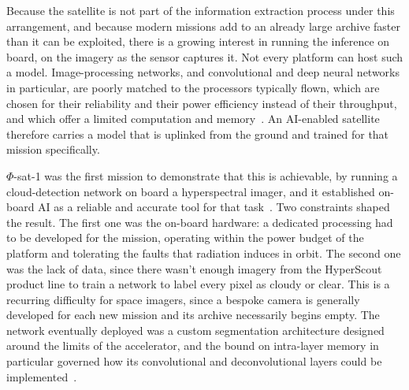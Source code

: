 Because the satellite is not part of the information extraction process under this arrangement, and because modern missions add to an already large archive faster than it can be exploited, there is a growing interest in running the inference on board, on the imagery as the sensor captures it.
Not every platform can host such a model.
Image-processing networks, and convolutional and deep neural networks in particular, are poorly matched to the processors typically flown, which are chosen for their reliability and their power efficiency instead of their throughput, and which offer a limited computation and memory~\cite{barretta2026onboardaireview}.
An AI-enabled satellite therefore carries a model that is uplinked from the ground and trained for that mission specifically.

$\Phi$-sat-1 was the first mission to demonstrate that this is achievable, by running a cloud-detection network on board a hyperspectral imager, and it established on-board AI as a reliable and accurate tool for that task~\cite{giuffrida2021phisat1}.
Two constraints shaped the result.
The first one was the on-board hardware: a dedicated processing had to be developed for the mission, operating within the power budget of the platform and tolerating the faults that radiation induces in orbit.
The second one was the lack of data, since there wasn't enough imagery from the HyperScout product line to train a network to label every pixel as cloudy or clear.
This is a recurring difficulty for space imagers, since a bespoke camera is generally developed for each new mission and its archive necessarily begins empty.
The network eventually deployed was a custom segmentation architecture designed around the limits of the accelerator, and the bound on intra-layer memory in particular governed how its convolutional and deconvolutional layers could be implemented~\cite{giuffrida2020cloudscout}.


